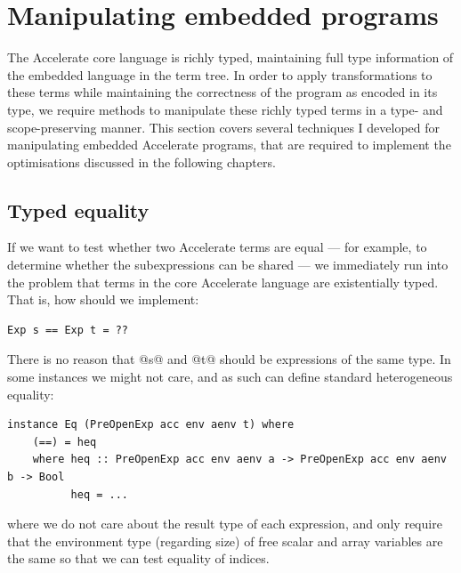 \section{Manipulating embedded programs}
\label{sec:manipulating_embedded_programs}


The Accelerate core language is richly typed, maintaining full type information
of the embedded language in the term tree. In order to apply transformations to
these terms while maintaining the correctness of the program as encoded in its
type, we require methods to manipulate these richly typed terms in a type- and
scope-preserving manner. This section covers several techniques I developed for
manipulating embedded Accelerate programs, that are required to implement the
optimisations discussed in the following chapters.


\subsection{Typed equality}
\label{sec:equality}

If we want to test whether two Accelerate terms are equal --- for example, to
determine whether the subexpressions can be shared --- we immediately run into
the problem that terms in the core Accelerate language are existentially typed.
That is, how should we implement:
%
\begin{lstlisting}[style=haskell]
Exp s == Exp t = ??
\end{lstlisting}
%
There is no reason that @s@ and @t@ should be expressions of the same
type. In some instances we might not care, and as such can define standard
heterogeneous equality:
%
\begin{lstlisting}[style=haskell]
instance Eq (PreOpenExp acc env aenv t) where
    (==) = heq
    where heq :: PreOpenExp acc env aenv a -> PreOpenExp acc env aenv b -> Bool
          heq = ...
\end{lstlisting}
%
where we do not care about the result type of each expression, and only require
that the environment type (regarding size) of free scalar and array variables
are the same so that we can test equality of  indices.

